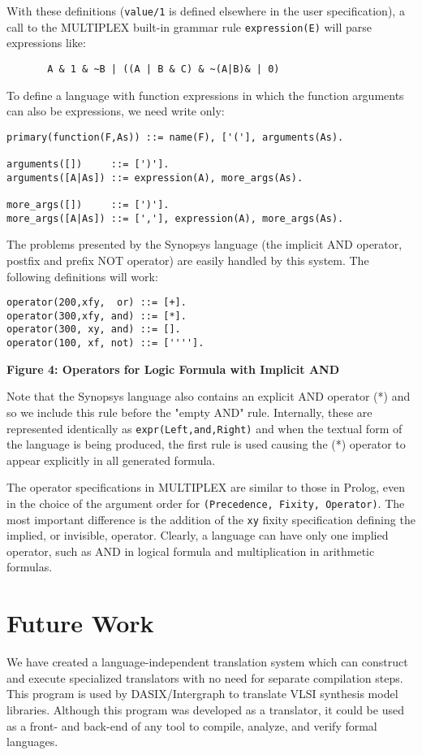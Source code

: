 \vskip 0.2cm
With these definitions ({\tt value/1} is
defined elsewhere in the user specification),
a call to the MULTIPLEX built-in grammar rule {\tt expression(E)}
will parse expressions like:
\begin{verbatim}
       A & 1 & ~B | ((A | B & C) & ~(A|B)& | 0)
\end{verbatim}
To define a language with function expressions
in which the function arguments can also be expressions,
we need write only:
\begin{verbatim}
primary(function(F,As)) ::= name(F), ['('], arguments(As).

arguments([])     ::= [')'].
arguments([A|As]) ::= expression(A), more_args(As).

more_args([])     ::= [')'].
more_args([A|As]) ::= [','], expression(A), more_args(As).
\end{verbatim}
The problems presented by the Synopsys language
(the implicit AND operator, postfix and prefix NOT operator)
are easily handled by this system.
The following definitions will work:
\begin{verbatim}
operator(200,xfy,  or) ::= [+].
operator(300,xfy, and) ::= [*].
operator(300, xy, and) ::= [].
operator(100, xf, not) ::= [''''].
\end{verbatim}
\centerline{\bf Figure 4: Operators for Logic Formula with Implicit AND}
\vskip 0.2cm
Note that the Synopsys language also contains an
explicit AND operator (*) and so we include
this rule before the "empty AND" rule. Internally,
these are represented identically as {\tt expr(Left,and,Right)}
and when the textual form of the language is being produced,
the first rule is used causing the (*) operator
to appear explicitly in all generated formula.

The operator specifications in MULTIPLEX are similar
to those in Prolog, even in the choice of the argument
order for {\tt (Precedence, Fixity, Operator)}. The most
important difference is the addition of the {\tt xy} fixity 
specification defining the implied, or invisible, operator.
Clearly, a language can have only one implied operator,
such as AND in logical formula and multiplication in
arithmetic formulas.

\section{Future Work}

We have created a language-independent translation
system which can construct and execute specialized
translators with no need for separate compilation steps.
This program is used by DASIX/Intergraph
to translate VLSI synthesis model libraries.
Although this program was developed as a translator,
it could be used as a front- and back-end
of any tool to compile, analyze, and verify
formal languages.

